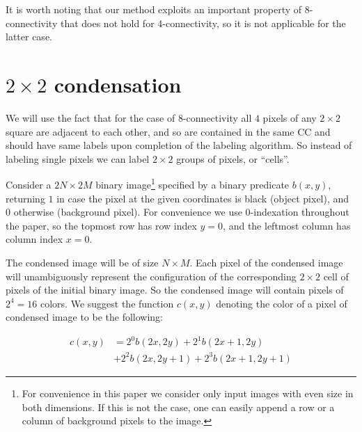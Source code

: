 \documentclass[hidelinks]{llncs}
\newcommand{\texten}[1]{#1}
\newcommand{\textru}[1]{}
\begin{document}
It is worth noting that our method exploits an important property of 8-connectivity
that does not hold for 4-connectivity, so it is not applicable for the latter case.

\section{$2\times2$ condensation}

\texten{
We will use the fact that for the case of 8-connectivity all $4$ pixels of any
$2 \times 2$ square are adjacent to each other, and so are contained in the same CC
and should have same labels upon completion of the labeling algorithm.
So instead of labeling single pixels we can label $2 \times 2$ groups of pixels,
or ``cells''.
}\textru{
Наблюдение: с 8-связностью в любом квадратике $2 \times 2$ любые два пикселя
находятся рядом. Значит если это пара объектных пикселей, то они находятся в одной
КС, и значит каждый такой квадратик пересекается не более чем с одной КС.
Поэтому вместо маркировки отдельных пикселей можно маркировать такие квадраты.
Назовём их клетками.
}


\texten{
Consider a $2N \times 2M$ binary image\footnote{
  For convenience in this paper we consider only input images with even size
  in both dimensions. If this is not the case, one can easily append a row or
  a column of background pixels to the image.
}
specified by a binary predicate $b(x, y)$,
returning $1$ in case the pixel at the given coordinates is black (object pixel),
and $0$ otherwise (background pixel).
For convenience we use 0-indexation throughout the paper, so the topmost row has
row index $y=0$, and the leftmost column has column index $x=0$.
}\textru{
Рассмотрим бинарное изображение размера $2N \times 2M$\footnote{
  Для удобства мы рассматриваем только изображения с чётной высотой и шириной.
  В общем случае при необходимости можно добавить строку или столбец с фоновыми
  пикселями.
},
заданное предикатом $b(x, y)$, который возвращает $1$, если переданы координаты
объектного пикселя, и $0$ иначе.
Мы везде будем использовать $0$-индексацию: верхняя строка и левый столбец имеют
номер $0$.
}


\texten{
The condensed image will be of size $N \times M$.
Each pixel of the condensed image will unambiguously represent the configuration
of the corresponding $2\times 2$ cell of pixels of the initial binary image.
So the condensed image will contain pixels of $2^4 = 16$ colors.
We suggest the function $c(x, y)$ denoting the color of a pixel of condensed image
to be the following:
}\textru{
Сжатое изображение будет иметь размер $N \times M$.
Каждый пиксель полученного изображения должен будет однозначно задавать конфигурацию
соответствующих четырёх пикселей исходного изображения, поэтому он может быть одного
из $2^4 = 16$ цветов. Предлагается такая функция $c(x,y)$, кодирующая четыре исходных
пикселя в цвет клетки:
}
\begin{align*}
  c(x, y) &= 2^0 b(2x, 2y)   + 2^1 b(2x+1, 2y) \\
          &+ {} 2^2 b(2x, 2y+1) + 2^3 b(2x+1,2y+1)
\end{align*}
\end{document}

